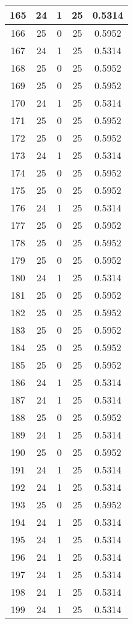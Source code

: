 \documentclass[letterpaper, 12pt]{article}
\begin{document}
\begin{longtable}{|c|c|c|c|c|}
\hline
165 & 24 & 1 & 25 & 0.5314 \\
\hline
166 & 25 & 0 & 25 & 0.5952 \\
\hline
167 & 24 & 1 & 25 & 0.5314 \\
\hline
168 & 25 & 0 & 25 & 0.5952 \\
\hline
169 & 25 & 0 & 25 & 0.5952 \\
\hline
170 & 24 & 1 & 25 & 0.5314 \\
\hline
171 & 25 & 0 & 25 & 0.5952 \\
\hline
172 & 25 & 0 & 25 & 0.5952 \\
\hline
173 & 24 & 1 & 25 & 0.5314 \\
\hline
174 & 25 & 0 & 25 & 0.5952 \\
\hline
175 & 25 & 0 & 25 & 0.5952 \\
\hline
176 & 24 & 1 & 25 & 0.5314 \\
\hline
177 & 25 & 0 & 25 & 0.5952 \\
\hline
178 & 25 & 0 & 25 & 0.5952 \\
\hline
179 & 25 & 0 & 25 & 0.5952 \\
\hline
180 & 24 & 1 & 25 & 0.5314 \\
\hline
181 & 25 & 0 & 25 & 0.5952 \\
\hline
182 & 25 & 0 & 25 & 0.5952 \\
\hline
183 & 25 & 0 & 25 & 0.5952 \\
\hline
184 & 25 & 0 & 25 & 0.5952 \\
\hline
185 & 25 & 0 & 25 & 0.5952 \\
\hline
186 & 24 & 1 & 25 & 0.5314 \\
\hline
187 & 24 & 1 & 25 & 0.5314 \\
\hline
188 & 25 & 0 & 25 & 0.5952 \\
\hline
189 & 24 & 1 & 25 & 0.5314 \\
\hline
190 & 25 & 0 & 25 & 0.5952 \\
\hline
191 & 24 & 1 & 25 & 0.5314 \\
\hline
192 & 24 & 1 & 25 & 0.5314 \\
\hline
193 & 25 & 0 & 25 & 0.5952 \\
\hline
194 & 24 & 1 & 25 & 0.5314 \\
\hline
195 & 24 & 1 & 25 & 0.5314 \\
\hline
196 & 24 & 1 & 25 & 0.5314 \\
\hline
197 & 24 & 1 & 25 & 0.5314 \\
\hline
198 & 24 & 1 & 25 & 0.5314 \\
\hline
199 & 24 & 1 & 25 & 0.5314 \\
\hline
\end{longtable}
\end{document}
